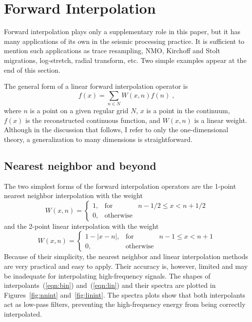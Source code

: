 \section{Forward Interpolation}

Forward interpolation plays only a supplementary role in this paper,
but it has many applications of its own in the seismic processing
practice. It is sufficient to mention such applications as trace
resampling, NMO, Kirchoff and Stolt migrations, log-stretch, radial
transform, etc. Two simple examples appear at the end of this section.
\par
The general form of a linear forward interpolation operator is 
\begin{equation}\label{eqn:linear}
  f (x) = \sum_{n \in N} W (x, n) f (n)\;,
\end{equation}
where $n$ is a point on a given regular grid $N$, $x$ is a point in
the continuum, $f(x)$ is the reconstructed continuous function, and
$W(x,n)$ is a linear weight. Although in the discussion that follows, I refer
to only the one-dimensional theory, a generalization to many
dimensions is straightforward.

\subsection{Nearest neighbor and beyond}

The two simplest forms of the forward interpolation operators are the
1-point nearest neighbor interpolation with the weight
\begin{equation}\label{eqn:bin}
  W (x, n) = \left\{\begin{array}{lcr}
1, & \mbox{for} & n - 1/2 \leq x < n + 1/2 \\
0, & \mbox{otherwise} &
\end{array}\right.
\end{equation}
and the 2-point linear interpolation with the weight
\begin{equation}\label{eqn:lin}
  W (x, n) = \left\{\begin{array}{lcr}
1 - |x-n|, & \mbox{for} & n - 1 \leq x < n + 1 \\
0, & \mbox{otherwise} &
\end{array}\right.
\end{equation}
Because of their simplicity, the nearest neighbor and linear
interpolation methods are very practical and easy to apply. Their
accuracy is, however, limited and may be inadequate for
interpolating high-frequency signals. The shapes of
interpolants~(\ref{eqn:bin}) and~(\ref{eqn:lin}) and their spectra are
plotted in Figures~\ref{fig:nnint} and~\ref{fig:linint}. The spectra
plots show that both interpolants act as low-pass filters, preventing
the high-frequency energy from being correctly interpolated.

